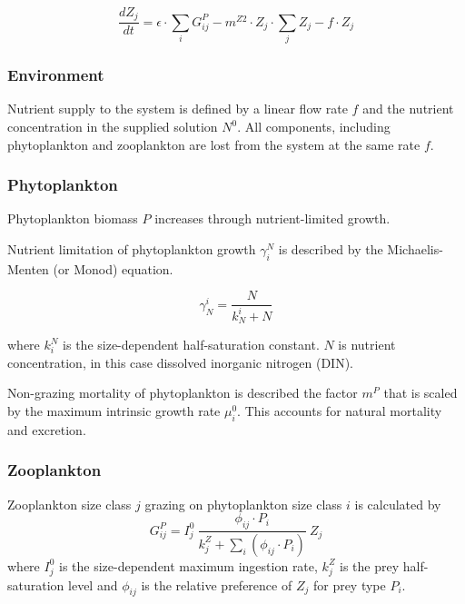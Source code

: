 \documentclass[template.tex]{subfiles}
\begin{document}
\begin{equation}
    \frac{d Z_j}{d t} =
    \epsilon \cdot \sum_{i} G_{ij}^P %
    - m^{Z2} \cdot Z_j \cdot \sum_{j} Z_j  %
    - f \cdot Z_j
\end{equation}



\subsubsection{Environment}

Nutrient supply to the system is defined by a linear flow rate $f$ and the nutrient concentration in the supplied solution $N^0$. All components, including phytoplankton and zooplankton are lost from the system at the same rate $f$.

\subsubsection{Phytoplankton}
Phytoplankton biomass $P$ increases through  nutrient-limited growth. 

Nutrient limitation of phytoplankton growth $\gamma_i^N$ is described by the Michaelis-Menten (or Monod) equation.

\begin{equation}
    \gamma^i_N =  \frac{N}{k^i_N + N} 
\end{equation}

where $k_i^N$ is the size-dependent half-saturation constant. $N$ is nutrient concentration, in this case dissolved inorganic nitrogen (DIN).


Non-grazing mortality of phytoplankton is described the factor $m^P$ that is scaled by the maximum intrinsic growth rate $\mu_i^{0}$. This accounts for natural mortality and excretion.

\subsubsection{Zooplankton}
Zooplankton size class $j$ grazing on phytoplankton size class $i$ is calculated by
\begin{equation}
    G_{ij}^P = I_j^0 \ \frac{ \phi_{ij} \cdot P_i }{ k_j^Z + \sum_{i}(\phi_{ij} \cdot P_i) } \ Z_j
\end{equation}
where $I_j^0$ is the size-dependent maximum ingestion rate, $k_j^Z$ is the prey half-saturation level and $\phi_{ij}$ is the relative preference of $Z_j$ for prey type $P_i$.\\
\end{document}
